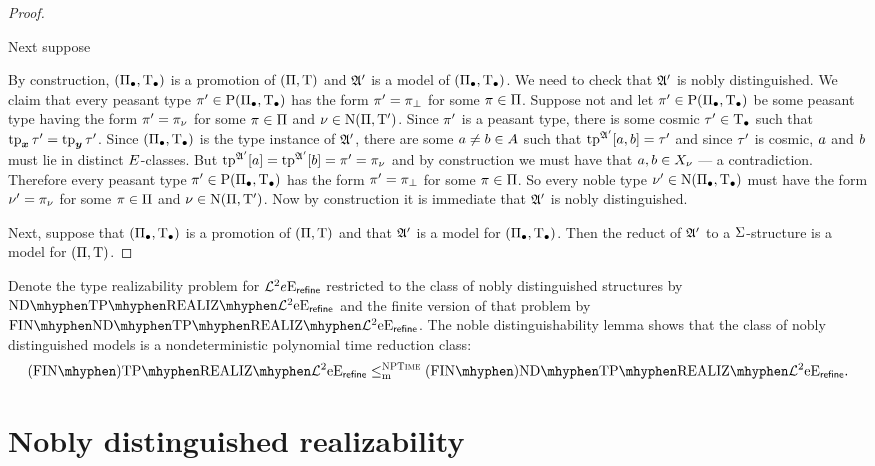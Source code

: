 \begin{proof}
\begin{itemize}
  Next suppose 
\end{itemize}

 By
construction, $(\Pi_{\bullet},\mathrm{T}_{\bullet})$ is a promotion of $(\Pi,\mathrm{T})$ and $\mathfrak{A'}$ is a
model of $(\Pi_{\bullet},\mathrm{T}_{\bullet})$.
We need to check that $\mathfrak{A'}$ is nobly distinguished.
We claim that every peasant type ${\pi'} \in \mathrm{P}(\Pi_{\bullet},\mathrm{T}_{\bullet})$ has the form
${\pi'} = {\pi}_{\bot}$ for some $\pi\in\Pi$.
Suppose not and let ${\pi'}\in \mathrm{P}(\Pi_{\bullet},\mathrm{T}_{\bullet})$ be some peasant type having
the form ${\pi'} = {\pi}_{\nu}$ for some $\pi\in\Pi$ and
$\nu\in\mathrm{\mathrm{N}}(\Pi,{\mathrm{T}'})$. 
Since ${\pi'}$ is a peasant type, there is some cosmic ${\tau'} \in \mathrm{T}_{\bullet}$ such
that $\operatorname{tp}_{\bm{x}}{\tau'} = \operatorname{tp}_{\bm{y}}{\tau'}$. Since $(\Pi_{\bullet},\mathrm{T}_{\bullet})$ is the type instance of
$\mathfrak{A'}$, there are some $a \neq b \in A$ such that $\operatorname{tp}^{\mathfrak{A'}}[a,b] = {\tau'}$ and
since ${\tau'}$ is cosmic, $a$ and $b$ must lie in distinct $E$-classes.
But $\operatorname{tp}^{\mathfrak{A'}}[a] = \operatorname{tp}^{\mathfrak{A'}}[b] = {\pi'} = {\pi}_{\nu}$ and by
construction we must have that $a, b \in X_\nu$ --- a contradiction.
Therefore every peasant type ${\pi'} \in \mathrm{P}(\Pi_{\bullet},\mathrm{T}_{\bullet})$ has the form
${\pi'} = {\pi}_{\bot}$ for some $\pi \in \Pi$. So every noble type ${\nu'}
\in \mathrm{\mathrm{N}}(\Pi_{\bullet},\mathrm{T}_{\bullet})$ must have the form ${\nu'} = {\pi}_{\nu}$ for some
$\pi \in \Pi$ and $\nu \in \mathrm{\mathrm{N}}(\Pi,{\mathrm{T}'})$. Now by construction it is
immediate that $\mathfrak{A'}$ is nobly distinguished.

Next, suppose that $(\Pi_{\bullet},\mathrm{T}_{\bullet})$ is a promotion of $(\Pi,\mathrm{T})$ and
that $\mathfrak{A'}$ is a model for $(\Pi_{\bullet},\mathrm{T}_{\bullet})$. Then the reduct of $\mathfrak{A'}$
to a $\mathrm{\Sigma}$-structure is a model for $(\Pi,\mathrm{T})$.
\end{proof}
Denote the type realizability problem for $\mathcal{L}^{2}{e}\mathrm{E}_{\mathsf{refine}}$ restricted to
the class of nobly distinguished structures by $\NDReal{\vFo2\Eea\sze\agrefine}$ and the finite
version of that problem by $\FinNDReal{\vFo2\Eea\sze\agrefine}$.
The noble distinguishability lemma shows that the class of nobly distinguished
models is a nondeterministic polynomial time reduction class:
\[
  \FinAReal{\vFo2\Eea\sze\agrefine} \red{\cNP} \FinANDReal{\vFo2\Eea\sze\agrefine}.
\]

\section{Nobly distinguished realizability}

